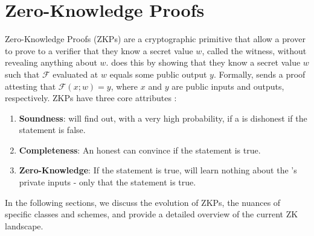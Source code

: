\section{Zero-Knowledge Proofs}

Zero-Knowledge Proofs (ZKPs) are a cryptographic primitive that allow a prover \Prv to prove to a verifier \Vrf that they know a secret value $w$, called the witness, without revealing anything about $w$. \Prv does this by showing that they know a secret value $w$ such that $\mathcal{F}$ evaluated at $w$ equals some public output $y$. Formally, \Prv sends a proof attesting that $\mathcal{F}(x; w)=y$, where $x$ and $y$ are public inputs and outputs, respectively. ZKPs have three core attributes \cite{goldreich1994definitions}:
\begin{enumerate}
    \item \textbf{Soundness}: \Vrf will find out, with a very high probability, if a \Prv is dishonest if the statement is false.
    \item \textbf{Completeness}: An honest \Prv can convince \Vrf if the statement is true.
    \item \textbf{Zero-Knowledge}: If the statement is true, \Vrf will learn nothing about the \Prv's private inputs - only that the statement is true.
\end{enumerate}
In the following sections, we discuss the evolution of ZKPs, the nuances of specific classes and schemes, and provide a detailed overview of the current ZK landscape.



